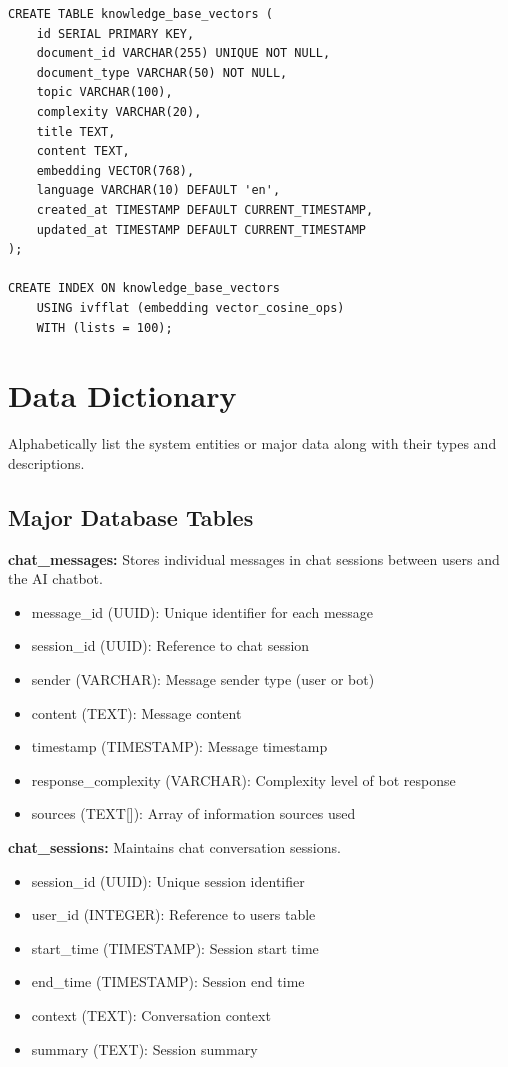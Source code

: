 \documentclass[12pt,a4paper]{report}
\begin{document}
\begin{lstlisting}
CREATE TABLE knowledge_base_vectors (
    id SERIAL PRIMARY KEY,
    document_id VARCHAR(255) UNIQUE NOT NULL,
    document_type VARCHAR(50) NOT NULL,
    topic VARCHAR(100),
    complexity VARCHAR(20),
    title TEXT,
    content TEXT,
    embedding VECTOR(768),
    language VARCHAR(10) DEFAULT 'en',
    created_at TIMESTAMP DEFAULT CURRENT_TIMESTAMP,
    updated_at TIMESTAMP DEFAULT CURRENT_TIMESTAMP
);

CREATE INDEX ON knowledge_base_vectors 
    USING ivfflat (embedding vector_cosine_ops)
    WITH (lists = 100);
\end{lstlisting}

\section{Data Dictionary}

Alphabetically list the system entities or major data along with their types and descriptions.

\subsection{Major Database Tables}

\textbf{chat\_messages:} Stores individual messages in chat sessions between users and the AI chatbot.
\begin{itemize}
    \item message\_id (UUID): Unique identifier for each message
    \item session\_id (UUID): Reference to chat session
    \item sender (VARCHAR): Message sender type (user or bot)
    \item content (TEXT): Message content
    \item timestamp (TIMESTAMP): Message timestamp
    \item response\_complexity (VARCHAR): Complexity level of bot response
    \item sources (TEXT[]): Array of information sources used
\end{itemize}

\textbf{chat\_sessions:} Maintains chat conversation sessions.
\begin{itemize}
    \item session\_id (UUID): Unique session identifier
    \item user\_id (INTEGER): Reference to users table
    \item start\_time (TIMESTAMP): Session start time
    \item end\_time (TIMESTAMP): Session end time
    \item context (TEXT): Conversation context
    \item summary (TEXT): Session summary
\end{itemize}
\end{document}
